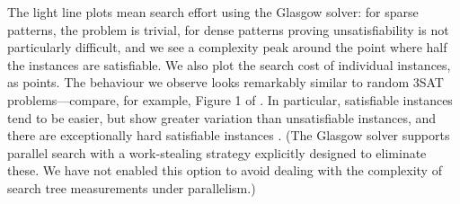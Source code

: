 \documentclass[twoside,11pt]{article}
\newcommand{\citet}[1]{\citeA{#1}}
\newcommand{\citep}[1]{\cite{#1}}
\begin{document}
The light line plots mean search effort using the Glasgow solver: for sparse patterns, the problem
is trivial, for dense patterns proving unsatisfiability is not particularly difficult, and we see a
complexity peak around the point where half the instances are satisfiable.  We also plot the search
cost of individual instances, as points. The behaviour we observe looks remarkably similar to random
3SAT problems---compare, for example, Figure 1 of \citet{LeytonBrown:2014}. In particular,
satisfiable instances tend to be easier, but show greater variation than unsatisfiable instances, and
there are exceptionally hard satisfiable instances \citep{Smith:1997}. (The Glasgow solver supports
parallel search with a work-stealing strategy explicitly designed to eliminate these. We have not
enabled this option to avoid dealing with the complexity of search tree measurements under
parallelism.)
\end{document}
